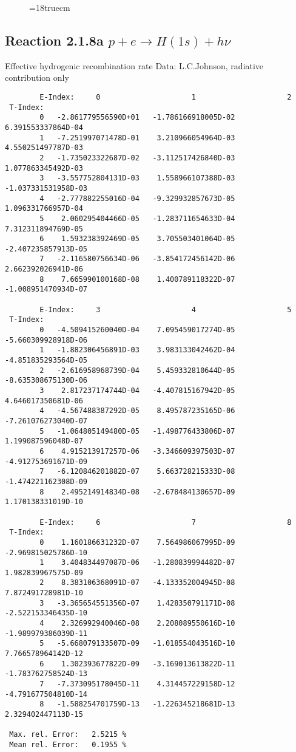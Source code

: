 \begin{figure} \label{2.1.8FU}
\epsfxsize=18truecm
\end{figure}
\newpage


\subsection{
  Reaction 2.1.8a  $p + e \rightarrow H(1s) + h\nu $
}

   Effective hydrogenic recombination rate
   Data: L.C.Johnson, radiative contribution only


\begin{verbatim}
        E-Index:     0                     1                     2
 T-Index:
        0   -2.861779556590D+01   -1.786166918005D-02    6.391553337864D-04
        1   -7.251997071478D-01    3.210966054964D-03    4.550251497787D-03
        2   -1.735023322687D-02   -3.112517426840D-03    1.077863345492D-03
        3   -3.557752804131D-03    1.558966107388D-03   -1.037331531958D-03
        4   -2.777882255016D-04   -9.329932857673D-05    1.096331766957D-04
        5    2.060295404466D-05   -1.283711654633D-04    7.312311894769D-05
        6    1.593238392469D-05    3.705503401064D-05   -2.407235857913D-05
        7   -2.116580756634D-06   -3.854172456142D-06    2.662392026941D-06
        8    7.665990100168D-08    1.400789118322D-07   -1.008951470934D-07

        E-Index:     3                     4                     5
 T-Index:
        0   -4.509415260040D-04    7.095459017274D-05   -5.660309928918D-06
        1   -1.882306456891D-03    3.983133042462D-04   -4.851835293564D-05
        2   -2.616958968739D-04    5.459332810644D-05   -8.635308675130D-06
        3    2.817237174744D-04   -4.407815167942D-05    4.646017350681D-06
        4   -4.567488387292D-05    8.495787235165D-06   -7.261076273040D-07
        5   -1.064805149480D-05   -1.498776433806D-07    1.199087596048D-07
        6    4.915213917257D-06   -3.346609397503D-07   -4.912753691671D-09
        7   -6.120846201882D-07    5.663728215333D-08   -1.474221162308D-09
        8    2.495214914834D-08   -2.678484130657D-09    1.170138331019D-10

        E-Index:     6                     7                     8
 T-Index:
        0    1.160186631232D-07    7.564986067995D-09   -2.969815025786D-10
        1    3.404834497087D-06   -1.280839994482D-07    1.982839967575D-09
        2    8.383106368091D-07   -4.133352004945D-08    7.872491728981D-10
        3   -3.365654551356D-07    1.428350791171D-08   -2.522153346435D-10
        4    2.326992940046D-08    2.208089550616D-10   -1.989979386039D-11
        5   -5.668079133507D-09   -1.018554043516D-10    7.766578964142D-12
        6    1.302393677822D-09   -3.169013613822D-11   -1.783762758524D-13
        7   -7.373095178045D-11    4.314457229158D-12   -4.791677504810D-14
        8   -1.588254701759D-13   -1.226345218681D-13    2.329402447113D-15

 Max. rel. Error:   2.5215 %
 Mean rel. Error:   0.1955 %


\end{verbatim}
